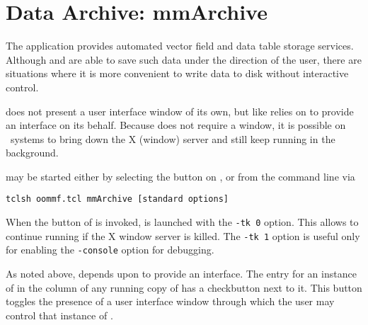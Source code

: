 \section{Data Archive: mmArchive}\label{sec:mmarchive}%

\begin{center}
\end{center}

The application  provides automated vector field and data
table storage services.  Although
and
are able to save such data under the direction of the user, there are
situations where it is more convenient to write data to disk without
interactive control.

 does not present a user interface window of its
own, but like {} relies on
{} to provide an
interface on its behalf.  Because  does not require a
window, it is possible on \Unix\ systems to bring down the X (window)
server
and still keep  running in the background.

 may be started either by selecting the
 button on , 
or from the command line via
\begin{verbatim}
tclsh oommf.tcl mmArchive [standard options]
\end{verbatim}

When the  button of  is invoked,
 is launched with the {{\tt -tk 0}} option.
This allows  to continue running if the X
window server is killed.  The {{\tt -tk 1}} option is useful
only for enabling the {{\tt -console}} option for debugging.

As noted above,  depends upon
 to provide an interface.
The entry for an instance of  in the
 column of any running copy of  has a
checkbutton next to it.  This button toggles the presence of a user
interface window through which the user may control that instance of
.

